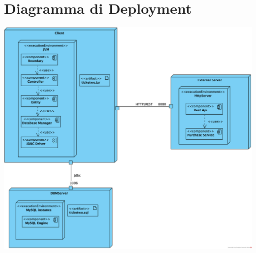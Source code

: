 \section{Diagramma di Deployment}
\begin{center}
    \includegraphics[width=0.5\linewidth]{assets/deployment/DeploymentDiagram}
\end{center}